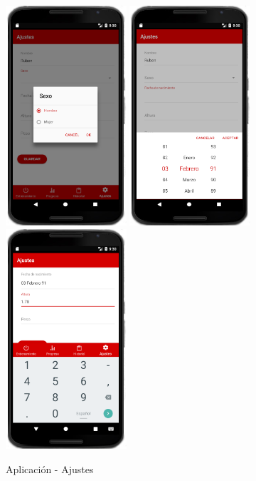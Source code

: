 \documentclass[a4paper, 11pt]{article}
\begin{document}
\begin{itemize}
                    \begin{figure}[H]
                     \centering
                     \includegraphics[width=0.4\textwidth]{11ajustes-sexo}
                     \includegraphics[width=0.4\textwidth]{12ajuste-fecha}
                     \includegraphics[width=0.4\textwidth]{13ajuste-altura}
                     \caption{Aplicación - Ajustes}
                     \label{f:app-ajustes-pack}
                    \end{figure}




\end{itemize}
\end{document}
